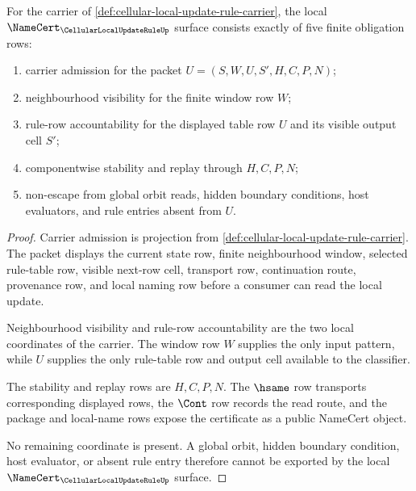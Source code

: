 \begin{theorem}
\label{thm:cellular-local-update-rule-namecert-obligations}
For the carrier of \autoref{def:cellular-local-update-rule-carrier}, the local $\NameCert_{\CellularLocalUpdateRuleUp}$ surface consists exactly of five finite obligation rows:
\begin{enumerate}
\item carrier admission for the packet $U=(S,W,U,S',H,C,P,N)$;
\item neighbourhood visibility for the finite window row $W$;
\item rule-row accountability for the displayed table row $U$ and its visible output cell $S'$;
\item componentwise stability and replay through $H,C,P,N$;
\item non-escape from global orbit reads, hidden boundary conditions, host evaluators, and rule entries absent from $U$.
\end{enumerate}
\end{theorem}
\begin{proof}
Carrier admission is projection from \autoref{def:cellular-local-update-rule-carrier}. The packet displays the current state row, finite neighbourhood window, selected rule-table row, visible next-row cell, transport row, continuation route, provenance row, and local naming row before a consumer can read the local update.

Neighbourhood visibility and rule-row accountability are the two local coordinates of the carrier. The window row $W$ supplies the only input pattern, while $U$ supplies the only rule-table row and output cell available to the classifier.

The stability and replay rows are $H,C,P,N$. The $\hsame$ row transports corresponding displayed rows, the $\Cont$ row records the read route, and the package and local-name rows expose the certificate as a public NameCert object.

No remaining coordinate is present. A global orbit, hidden boundary condition, host evaluator, or absent rule entry therefore cannot be exported by the local $\NameCert_{\CellularLocalUpdateRuleUp}$ surface.
\end{proof}

